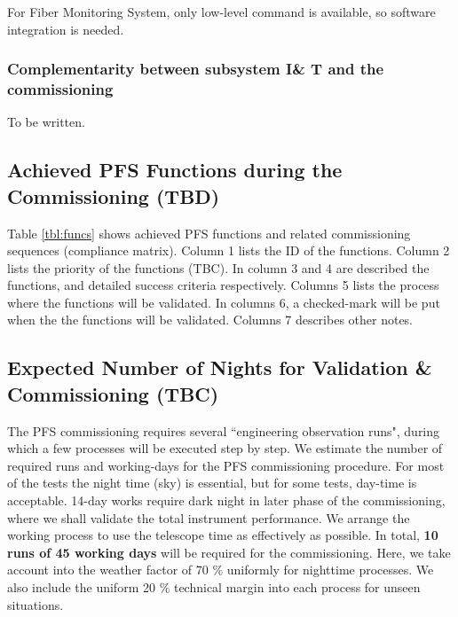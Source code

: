 For Fiber Monitoring System, only low-level command is available, so software integration is needed.

\subsubsection{Complementarity between subsystem I\& T and the commissioning}
To be written.

\subsection{Achieved PFS Functions during the Commissioning (TBD)}\label{sec:cmatrix}
Table \ref{tbl:funcs} shows achieved PFS functions and related commissioning sequences (compliance matrix).
Column 1 lists the ID of the functions.
Column 2 lists the priority of the functions (TBC).
In column 3 and 4 are described the functions, and detailed success criteria respectively.
Columns 5 lists the process  where the functions will be validated.
In columns 6, a checked-mark will be put when the the functions will be validated.
Columns 7 describes other notes.



\subsection{Expected Number of Nights for Validation \& Commissioning (TBC)}
The PFS commissioning requires several ``engineering observation runs", during which a few processes will be executed step by step.
We estimate the number of required runs and working-days for the PFS commissioning procedure.
For most of the tests the night time (sky) is essential, but for some tests, day-time is acceptable.
14-day works require dark night in later phase of the commissioning, where we shall validate the total instrument performance.
We arrange the working process to use the telescope time as effectively as possible.
In total, {\bf 10 runs of 45 working days} will be  required for the commissioning. 
Here, we take account into the weather factor of 70 \% uniformly  for nighttime processes.
We also include the uniform 20 \% technical margin into each process for unseen situations.

